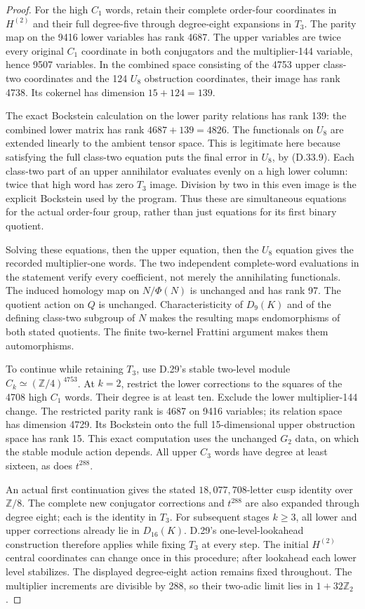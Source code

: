 \begin{proof}
For the high $C_1$ words, retain their complete order-four coordinates
in $H^{(2)}$ and their full degree-five through degree-eight expansions
in $T_3$. The parity map on the 9416 lower variables has rank 4687.
The upper variables are twice every original $C_1$ coordinate in both
conjugators and the multiplier-144 variable, hence 9507 variables.
In the combined space consisting of the 4753 upper class-two coordinates
and the 124 $U_8$ obstruction coordinates, their image has rank 4738.
Its cokernel has dimension $15+124=139$.

The exact Bockstein calculation on the lower parity relations has rank
139: the combined lower matrix has rank $4687+139=4826$. The functionals
on $U_8$ are extended linearly to the ambient tensor space. This is
legitimate here because satisfying the full class-two equation puts
the final error in $U_8$, by (D.33.9). Each class-two part of an upper
annihilator evaluates evenly on a high lower column: twice that high
word has zero $T_3$ image. Division by two in this even image is the
explicit Bockstein used by the program. Thus these are simultaneous
equations for the actual order-four group, rather than just equations
for its first binary quotient.

Solving these equations, then the upper equation, then the $U_8$
equation gives the recorded multiplier-one words. The two independent
complete-word evaluations in the statement verify every coefficient,
not merely the annihilating functionals. The induced homology map on
$N/\Phi(N)$ is unchanged and has rank 97. The quotient action on $Q$
is unchanged. Characteristicity of $D_9(K)$ and of the defining
class-two subgroup of $N$ makes the resulting maps endomorphisms of
both stated quotients. The finite two-kernel Frattini argument makes
them automorphisms.

To continue while retaining $T_3$, use D.29's stable two-level module
$C_k\simeq(\mathbb Z/4)^{4753}$. At $k=2$, restrict the lower
corrections to the squares of the 4708 high $C_1$ words. Their degree
is at least ten. Exclude the lower multiplier-144 change. The restricted
parity rank is 4687 on 9416 variables; its relation space has dimension
4729. Its Bockstein onto the full 15-dimensional upper obstruction
space has rank 15. This exact computation uses the unchanged $G_2$
data, on which the stable module action depends. All upper $C_3$
words have degree at least sixteen, as does $t^{288}$.

An actual first continuation gives the stated $18,077,708$-letter
cusp identity over $\mathbb Z/8$. The complete new conjugator
corrections and $t^{288}$ are also expanded through degree eight;
each is the identity in $T_3$. For subsequent stages $k\geq3$, all
lower and upper corrections already lie in $D_{16}(K)$. D.29's
one-level-lookahead construction therefore applies while fixing $T_3$
at every step. The initial $H^{(2)}$ central coordinates can change
once in this procedure; after lookahead each lower level stabilizes.
The displayed degree-eight action remains fixed throughout. The
multiplier increments are divisible by 288, so their two-adic limit
lies in $1+32\mathbb Z_2$.


\end{proof}
